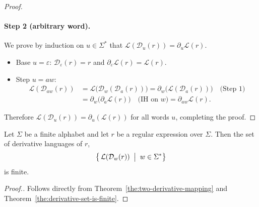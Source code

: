 \begin{proof}[Proof]
\paragraph{Step 2 (arbitrary word).}
We prove by induction on $u\in\Sigma^*$ that
$\mathcal{L}(\mathcal{D}_u(r))=\partial_u \mathcal{L}(r)$.
\begin{itemize}
  \item Base $u=\varepsilon$: $\mathcal{D}_\varepsilon(r)=r$ and $\partial_\varepsilon \mathcal{L}(r)=\mathcal{L}(r)$.
  \item Step $u=aw$:
    \[
      \begin{aligned}
      \mathcal{L}(\mathcal{D}_{aw}(r))
      &= \mathcal{L}\big(\mathcal{D}_w(\mathcal{D}_a(r))\big)
       = \partial_w\big(\mathcal{L}(\mathcal{D}_a(r))\big) \quad\text{(Step 1)} \\
      &= \partial_w\big(\partial_a \mathcal{L}(r)\big) \quad\text{(IH on $w$)}
       = \partial_{aw} \mathcal{L}(r).
      \end{aligned}
    \]
\end{itemize}
Therefore $\mathcal{L}(\mathcal{D}_u(r))=\partial_u (\mathcal{L}(r))$ for all words $u$, completing the proof.
\end{proof}



\begin{theorem}\label{the:regex-derivative-types-finite}
Let $\Sigma$ be a finite alphabet and let $r$ be a regular expression over $\Sigma$.
Then the set of derivative languages of $r$,
\[
  \bigl\{\, \mathcal{L}(\mathcal{D}_{w}(r)) \;\bigm|\; w \in \Sigma^* \bigr\}
\]
is finite. 
\end{theorem}

\begin{proof}[Proof.]
Follows directly from Theorem~\ref{the:two-derivative-mapping} and Theorem~\ref{the:derivative-set-is-finite}.
\end{proof}
